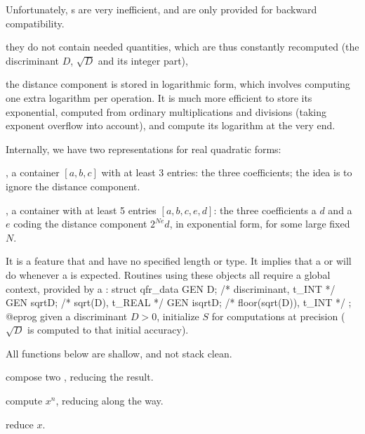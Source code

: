 
 Unfortunately, s
are very inefficient, and are only provided for backward compatibility.

\item they do not contain needed quantities, which are thus constantly
recomputed (the discriminant $D$, $\sqrt{D}$ and its integer part),

\item the distance component is stored in logarithmic form, which involves
computing one extra logarithm per operation. It is much more efficient
to store its exponential, computed from ordinary multiplications and
divisions (taking exponent overflow into account), and compute its logarithm
at the very end.

Internally, we have two representations for real quadratic forms:

\item {}, a container $[a,b,c]$ with at least 3 entries: the three
coefficients; the idea is to ignore the distance component.

\item {}, a container with at least 5 entries $[a,b,c,e,d]$: the
three coefficients a  $d$ and a  $e$ coding the distance
component $2^{Ne} d$, in exponential form, for some large fixed $N$.

It is a feature that  and  have no specified length or
type. It implies that a  or  will do whenever a 
is expected. Routines using these objects all require a global context,
provided by a :
\bprog
  struct qfr_data {
    GEN D;        /* discriminant, t_INT   */
    GEN sqrtD;    /* sqrt(D), t_REAL       */
    GEN isqrtD;   /* floor(sqrt(D)), t_INT */
  };
@eprog
given a discriminant $D > 0$, initialize $S$ for computations at precision
 ($\sqrt{D}$ is computed to that initial accuracy).

\noindent All functions below are shallow, and not stack clean.

 compose two
, reducing the result.

 compute $x^n$, reducing
along the way.

 reduce $x$.

